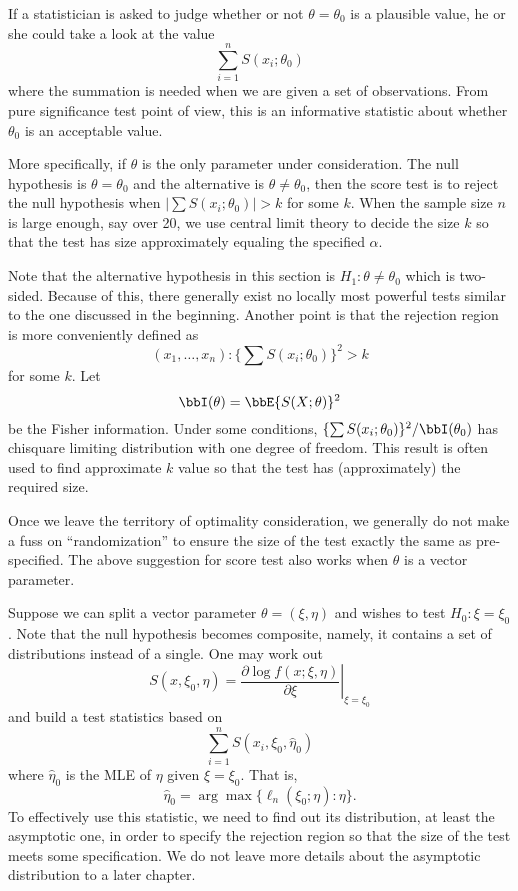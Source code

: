 If a statistician is asked to judge whether or not $\theta = \theta_0$
is a plausible value, he or she could take a look at the value
\[
\sum_{i=1}^n S(x_i; \theta_0)
\]
where the summation is needed when we are given
a set of  \iid observations.
From pure significance test point of view, this is an
informative statistic about whether $\theta_0$ is
an acceptable value.

More specifically, if $\theta$ is the only parameter under consideration.
The null hypothesis is $\theta = \theta_0$ and the alternative is
$\theta \neq \theta_0$, then the score test is to reject
the null hypothesis when $|\sum S(x_i; \theta_0)| > k$ for some $k$.
When the sample size $n$ is large enough, say over 20, we use
central limit theory to decide the size $k$ so that the test has
size approximately equaling the specified $\alpha$. 

Note that the alternative hypothesis in this section is
$H_1: \theta \neq \theta_0$ which is two-sided.
Because of this, there generally exist no locally most powerful
tests similar to the one discussed in the beginning.
Another point is that the rejection region is more
conveniently defined as
\[
(x_1, \ldots, x_n): \{ \sum S(x_i; \theta_0) \}^2 > k
\]
for some $k$. 
Let
\[
\bbI(\theta) = \bbE \{ S(X; \theta)\}^2
\]
be the Fisher information.
Under some conditions, $ \{ \sum S(x_i; \theta_0) \}^2/\bbI(\theta_0)$
has chisquare limiting distribution with one degree of freedom.
This result is often used to find approximate $k$ value so that
the test has (approximately) the required size.

Once we leave the territory of optimality consideration, we
generally do not make a fuss on ``randomization'' to 
ensure the size of the test exactly the same as pre-specified.
The above suggestion for score test
also works when $\theta$ is a vector parameter.

Suppose we can split a vector parameter $\theta = (\xi, \eta)$
and wishes to test $H_0: \xi = \xi_0$. Note that the null
hypothesis becomes composite, namely, it contains a set
of distributions instead of a single. One may work out
\[
S(x, \xi_0, \eta) = 
\left .
\frac{\partial \log f(x; \xi, \eta)}{\partial \xi} 
\right |_{\xi = \xi_0}
\]
and build a test statistics based on 
\[
\sum_{i=1}^n S(x_i, \xi_0, \hat \eta_0)
\]
where $\hat \eta_0$ is the MLE of $\eta$ given $\xi = \xi_0$.
That is,
\[
\hat \eta_0 = \arg\max \{\ell_n(\xi_0; \eta): \eta\}.
\]
To effectively use this statistic, we need to find out its distribution, 
at least the asymptotic one, in order to specify the rejection
region so that the size of the test meets some specification.
We do not leave more details about the asymptotic
distribution to a later chapter.

